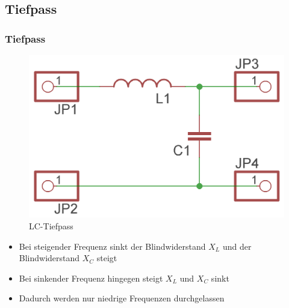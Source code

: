 \subsection*{Tiefpass}
\begin{frame}
  \frametitle{Tiefpass}
  \begin{center}
    \begin{figure}
      \includegraphics[width=\textwidth,height=.45\textheight,keepaspectratio]{e07/LC-Tiefpass.png}
      \caption{LC-Tiefpass}
    \end{figure}
  \end{center}
  \begin{itemize}
    \item Bei steigender Frequenz sinkt der Blindwiderstand $X_L$ und der Blindwiderstand $X_C$ steigt
    \item Bei sinkender Frequenz hingegen steigt $X_L$ und $X_C$ sinkt
    \item Dadurch werden nur niedrige Frequenzen durchgelassen
  \end{itemize}
\end{frame}

